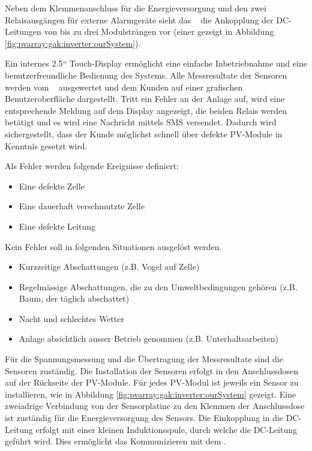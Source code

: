 Neben  dem   Klemmenanschluss  f\"ur   die  Energieversorgung  und   den  zwei
Relaisausg\"angen  f\"ur   externe  Alarmger\"ate   sieht  das   \Master~  die
Ankopplung der DC-Leitungen von bis zu drei Modulstr\"angen vor (einer gezeigt
in Abbildung \ref{fig:pvarray:gak:inverter:ourSystem}).

Ein  internes 2.5``  Touch-Display erm\"oglicht  eine einfache  Inbetriebnahme
und  eine benutzerfreundliche  Bedienung des  Systems. Alle Messresultate  der
Sensoren werden vom  \Master~ ausgewertet und dem Kunden  auf einer grafischen
Benutzeroberfl\"ache  dargestellt. Tritt ein  Fehler an  der Anlage  auf, wird
eine entsprechende Meldung auf dem Display angezeigt, die beiden Relais werden
bet\"atigt  und es  wird eine  Nachricht mittels  SMS versendet. Dadurch  wird
sichergestellt, dass der Kunde m\"oglichst schnell \"uber defekte PV-Module in
Kenntnis gesetzt wird.

\clearpage
Als Fehler werden folgende Ereignisse definiert:
\begin{itemize}
    \tightlist
    \item
        Eine defekte Zelle
    \item
        Eine dauerhaft verschmutzte Zelle
    \item
        Eine defekte Leitung
\end{itemize}

Kein Fehler soll in folgenden Situationen ausgel\"ost werden.
\begin{itemize}
    \tightlist
    \item
        Kurzzeitige Abschattungen (z.B. Vogel auf Zelle)
    \item
        Regelm\"assige Abschattungen,  die zu den  Umweltbedingungen geh\"oren
        (z.B. Baum, der t\"aglich abschattet)
    \item
        Nacht und schlechtes Wetter
    \item
        Anlage absichtlich ausser Betrieb genommen (z.B. Unterhaltsarbeiten)
\end{itemize}

F\"ur   die  Spannungsmessung   und   die   \"Ubertragung  der   Messresultate
sind  die   Sensoren  zust\"andig. Die   Installation  der   Sensoren  erfolgt
in  den   Anschlussdosen  auf  der  R\"uckseite   der  PV-Module. F\"ur  jedes
PV-Modul  ist   jeweils  ein   Sensor  zu   installieren,  wie   in  Abbildung
\ref{fig:pvarray:gak:inverter:ourSystem}  gezeigt. Eine zweiadrige  Verbindung
von der Sensorplatine  zu den Klemmen der Anschlussdose  ist zust\"andig f\"ur
die Energieversorgung  des Sensors. Die Einkopplung in  die DC-Leitung erfolgt
mit  einer  kleinen Induktionsspule,  durch  welche  die DC-Leitung  gef\"uhrt
wird. Dies erm\"oglicht das Kommunizieren mit dem \Master.


